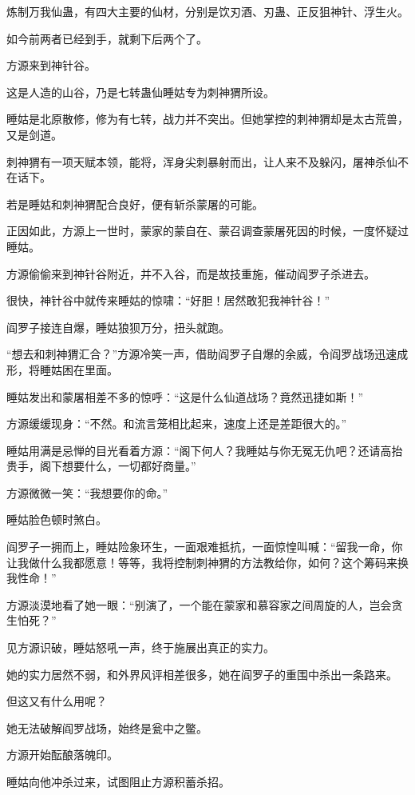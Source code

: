 \begin{this_body}
炼制万我仙蛊，有四大主要的仙材，分别是饮刃酒、刃蛊、正反狙神针、浮生火。

如今前两者已经到手，就剩下后两个了。

方源来到神针谷。

这是人造的山谷，乃是七转蛊仙睡姑专为刺神猬所设。

睡姑是北原散修，修为有七转，战力并不突出。但她掌控的刺神猬却是太古荒兽，又是剑道。

刺神猬有一项天赋本领，能将，浑身尖刺暴射而出，让人来不及躲闪，屠神杀仙不在话下。

若是睡姑和刺神猬配合良好，便有斩杀蒙屠的可能。

正因如此，方源上一世时，蒙家的蒙自在、蒙召调查蒙屠死因的时候，一度怀疑过睡姑。

方源偷偷来到神针谷附近，并不入谷，而是故技重施，催动阎罗子杀进去。

很快，神针谷中就传来睡姑的惊啸：“好胆！居然敢犯我神针谷！”

阎罗子接连自爆，睡姑狼狈万分，扭头就跑。

“想去和刺神猬汇合？”方源冷笑一声，借助阎罗子自爆的余威，令阎罗战场迅速成形，将睡姑困在里面。

睡姑发出和蒙屠相差不多的惊呼：“这是什么仙道战场？竟然迅捷如斯！”

方源缓缓现身：“不然。和流言笼相比起来，速度上还是差距很大的。”

睡姑用满是忌惮的目光看着方源：“阁下何人？我睡姑与你无冤无仇吧？还请高抬贵手，阁下想要什么，一切都好商量。”

方源微微一笑：“我想要你的命。”

睡姑脸色顿时煞白。

阎罗子一拥而上，睡姑险象环生，一面艰难抵抗，一面惊惶叫喊：“留我一命，你让我做什么我都愿意！等等，我将控制刺神猬的方法教给你，如何？这个筹码来换我性命！”

方源淡漠地看了她一眼：“别演了，一个能在蒙家和慕容家之间周旋的人，岂会贪生怕死？”

见方源识破，睡姑怒吼一声，终于施展出真正的实力。

她的实力居然不弱，和外界风评相差很多，她在阎罗子的重围中杀出一条路来。

但这又有什么用呢？

她无法破解阎罗战场，始终是瓮中之鳖。

方源开始酝酿落魄印。

睡姑向他冲杀过来，试图阻止方源积蓄杀招。


\end{this_body}
